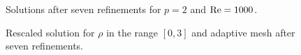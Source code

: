 \begin{figure}[!h]
\caption{Solutions after seven refinements for $p=2$ and $\Reyn = 1000$.}
\label{fig:Re500}
\end{figure}

\begin{figure}[!h]
\centering
{}
\caption{Rescaled solution for $\rho$ in the range $[0,3]$ and adaptive mesh after seven refinements.}
\label{fig:rhoScaled}
\end{figure}

